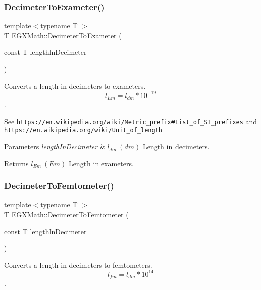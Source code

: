 \subsubsection{\texorpdfstring{Decimeter\+To\+Exameter()}{DecimeterToExameter()}}
{\footnotesize\ttfamily template$<$typename T $>$ \\
T E\+G\+X\+Math\+::\+Decimeter\+To\+Exameter (\begin{DoxyParamCaption}\item[{const T}]{length\+In\+Decimeter }\end{DoxyParamCaption})}



Converts a length in decimeters to exameters. \[ l_{Em}=l_{dm} * 10^{-19} \]. 

See \href{https://en.wikipedia.org/wiki/Metric_prefix#List_of_SI_prefixes}{\tt https\+://en.\+wikipedia.\+org/wiki/\+Metric\+\_\+prefix\#\+List\+\_\+of\+\_\+\+S\+I\+\_\+prefixes} and \href{https://en.wikipedia.org/wiki/Unit_of_length}{\tt https\+://en.\+wikipedia.\+org/wiki/\+Unit\+\_\+of\+\_\+length} 
\begin{DoxyParams}{Parameters}
{\em length\+In\+Decimeter} & $ l_{dm}\ (dm)$ Length in decimeters. \\
\hline
\end{DoxyParams}
\begin{DoxyReturn}{Returns}
$ l_{Em}\ (Em)$ Length in exameters. 
\end{DoxyReturn}
\mbox{\label{group___e_g_x_math-_conversions-_length_conversions-_decimeter-_s_i_gab06170fbc8b349582e4ae34d41f3f706}} 
\subsubsection{\texorpdfstring{Decimeter\+To\+Femtometer()}{DecimeterToFemtometer()}}
{\footnotesize\ttfamily template$<$typename T $>$ \\
T E\+G\+X\+Math\+::\+Decimeter\+To\+Femtometer (\begin{DoxyParamCaption}\item[{const T}]{length\+In\+Decimeter }\end{DoxyParamCaption})}



Converts a length in decimeters to femtometers. \[ l_{fm}=l_{dm} * 10^{14} \]. 

